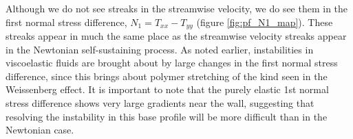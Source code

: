 \documentclass{jfm}
\newcommand\Wi{\mbox{\textit{Wi}}}
\newcommand\Rey{\mbox{\textit{Re}}}  %
\begin{document}
Although we do not see streaks in the streamwise velocity, we do see them in the first normal stress difference, $N_{1} = T_{xx} - T_{yy}$ (figure \ref{fig:pf_N1_map}). These streaks appear in much the same place as the streamwise velocity streaks appear in the Newtonian self-sustaining process. As noted earlier, instabilities in viscoelastic fluids are brought about by large changes in the first normal stress difference, since this brings about polymer stretching of the kind seen in the Weissenberg effect. It is important to note that the purely elastic 1st normal stress difference shows very large gradients near the wall, suggesting that resolving the instability in this base profile will be more difficult than in the Newtonian case.

\end{document}
